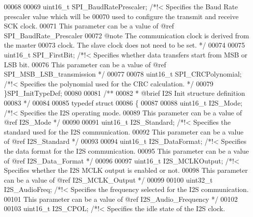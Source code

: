 \begin{DoxyCode}
00068 
00069   uint16\_t SPI_BaudRatePrescaler;   \textcolor{comment}{/*!< Specifies the Baud Rate prescaler value which will be}
00070 \textcolor{comment}{                                         used to configure the transmit and receive SCK clock.}
00071 \textcolor{comment}{                                         This parameter can be a value of @ref SPI\_BaudRate\_Prescaler}
00072 \textcolor{comment}{                                         @note The communication clock is derived from the master}
00073 \textcolor{comment}{                                               clock. The slave clock does not need to be set. */}
00074 
00075   uint16\_t SPI_FirstBit;            \textcolor{comment}{/*!< Specifies whether data transfers start from MSB or LSB bit.}
00076 \textcolor{comment}{                                         This parameter can be a value of @ref
       SPI\_MSB\_LSB\_transmission */}
00077 
00078   uint16\_t SPI_CRCPolynomial;       \textcolor{comment}{/*!< Specifies the polynomial used for the CRC calculation. */}
00079 \}SPI\_InitTypeDef;
00080 
00081 \textcolor{comment}{/** }
00082 \textcolor{comment}{  * @brief  I2S Init structure definition  }
00083 \textcolor{comment}{  */}
00084 
00085 \textcolor{keyword}{typedef} \textcolor{keyword}{struct}
00086 \{
00087 
00088   uint16\_t I2S_Mode;         \textcolor{comment}{/*!< Specifies the I2S operating mode.}
00089 \textcolor{comment}{                                  This parameter can be a value of @ref I2S\_Mode */}
00090 
00091   uint16\_t I2S_Standard;     \textcolor{comment}{/*!< Specifies the standard used for the I2S communication.}
00092 \textcolor{comment}{                                  This parameter can be a value of @ref I2S\_Standard */}
00093 
00094   uint16\_t I2S_DataFormat;   \textcolor{comment}{/*!< Specifies the data format for the I2S communication.}
00095 \textcolor{comment}{                                  This parameter can be a value of @ref I2S\_Data\_Format */}
00096 
00097   uint16\_t I2S_MCLKOutput;   \textcolor{comment}{/*!< Specifies whether the I2S MCLK output is enabled or not.}
00098 \textcolor{comment}{                                  This parameter can be a value of @ref I2S\_MCLK\_Output */}
00099 
00100   uint32\_t I2S_AudioFreq;    \textcolor{comment}{/*!< Specifies the frequency selected for the I2S communication.}
00101 \textcolor{comment}{                                  This parameter can be a value of @ref I2S\_Audio\_Frequency */}
00102 
00103   uint16\_t I2S_CPOL;         \textcolor{comment}{/*!< Specifies the idle state of the I2S clock.}

\end{DoxyCode}
